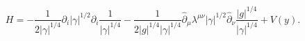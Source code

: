 \begin{equation}
H = -\frac{1}{2|\gamma|^{1/4}}\partial_i|\gamma|^{1/2}\partial_i\frac{1}{|\gamma|^{1/4}} - \frac{1}{2|g|^{1/4}|\gamma|^{1/4}}\hat{\partial}_{\mu}\lambda^{\mu\nu}|\gamma|^{1/2}\hat{\partial}_{\nu}\frac{|g|^{1/4}}{|\gamma|^{1/4}} + V(y) .
\label{2.13}
\end{equation}

